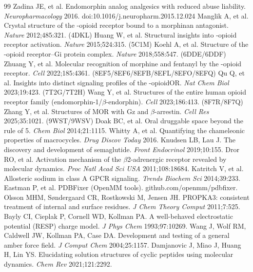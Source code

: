 \documentclass[11pt]{article}
\newcommand{\uor}{\textmu-opioid}
\newcommand{\bt}{$\beta$}
\begin{document}
\begin{thebibliography}{99}
\small
{} Zadina JE, et al. Endomorphin analog analgesics with reduced abuse liability.
  \emph{Neuropharmacology} 2016. doi:10.1016/j.neuropharm.2015.12.024
 Manglik A, et al. Crystal structure of the \uor{} receptor bound to a morphinan
  antagonist. \emph{Nature} 2012;485:321. (4DKL)
 Huang W, et al. Structural insights into \uor{} receptor activation.
  \emph{Nature} 2015;524:315. (5C1M)
 Koehl A, et al. Structure of the \uor{} receptor--Gi protein complex.
  \emph{Nature} 2018;558:547. (6DDE/6DDF)
 Zhuang Y, et al. Molecular recognition of morphine and fentanyl by the \uor{}
  receptor. \emph{Cell} 2022;185:4361. (8EF5/8EF6/8EFB/8EFL/8EFO/8EFQ)
 Qu Q, et al. Insights into distinct signaling profiles of the \uor OR.
  \emph{Nat Chem Biol} 2023;19:423. (7T2G/7T2H)
 Wang Y, et al. Structures of the entire human opioid receptor family
  (endomorphin-1/\bt-endorphin). \emph{Cell} 2023;186:413. (8F7R/8F7Q)
 Zhang Y, et al. Structures of MOR with Gz and \bt-arrestin. \emph{Cell Res}
  2025;35:1021. (9WST/9WSV)
 Doak BC, et al. Oral druggable space beyond the rule of 5. \emph{Chem Biol}
  2014;21:1115.
 Whitty A, et al. Quantifying the chameleonic properties of macrocycles.
  \emph{Drug Discov Today} 2016.
 Knudsen LB, Lau J. The discovery and development of semaglutide.
  \emph{Front Endocrinol} 2019;10:155.
 Dror RO, et al. Activation mechanism of the \bt2-adrenergic receptor revealed by
  molecular dynamics. \emph{Proc Natl Acad Sci USA} 2011;108:18684.
 Katritch V, et al. Allosteric sodium in class A GPCR signaling.
  \emph{Trends Biochem Sci} 2014;39:233.
 Eastman P, et al. PDBFixer (OpenMM tools). github.com/openmm/pdbfixer.
 Olsson MHM, S{\o}ndergaard CR, Rostkowski M, Jensen JH. PROPKA3: consistent
  treatment of internal and surface residues. \emph{J Chem Theory Comput} 2011;7:525.
 Bayly CI, Cieplak P, Cornell WD, Kollman PA. A well-behaved electrostatic potential
  (RESP) charge model. \emph{J Phys Chem} 1993;97:10269.
 Wang J, Wolf RM, Caldwell JW, Kollman PA, Case DA. Development and testing of a general
  amber force field. \emph{J Comput Chem} 2004;25:1157.
 Damjanovic J, Miao J, Huang H, Lin YS. Elucidating solution structures of
  cyclic peptides using molecular dynamics. \emph{Chem Rev} 2021;121:2292.

\end{thebibliography}
\end{document}
